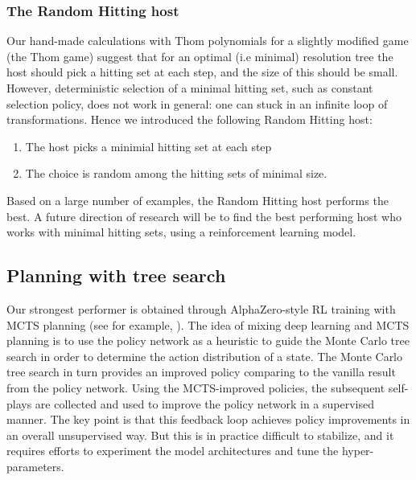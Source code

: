 \documentclass{article}
\theoremstyle{plain}
\theoremstyle{definition}
\theoremstyle{remark}
\begin{document}
\subsubsection{The Random Hitting host}\label{randomhittinghost}
Our hand-made calculations with Thom polynomials for a slightly modified game (the Thom game) suggest that for an optimal (i.e minimal) resolution tree the host should pick a hitting set at each step, and the size of this should be small. %
However, deterministic selection of a minimal hitting set, such as constant selection policy, does not work in general: one can stuck in an infinite loop of transformations. Hence we introduced the following Random Hitting host: 
\begin{enumerate}
    \item The host picks a minimial hitting set at each step 
    \item The choice is random among the hitting sets of minimal size. 
\end{enumerate}
Based on a large number of examples, the Random Hitting host performs the best. A future direction of research will be to find the best performing host who works with minimal hitting sets, using a reinforcement learning model. 


\subsection{Planning with tree search}\label{MCTS_planning}
Our strongest performer is obtained through AlphaZero-style RL training with MCTS planning (see for example, \cite{alphazero}). The idea of mixing deep learning and MCTS planning is to use the policy network as a heuristic to guide the Monte Carlo tree search in order to determine the action distribution of a state. The Monte Carlo tree search in turn provides an improved policy comparing to the vanilla result from the policy network. Using the MCTS-improved policies, the subsequent self-plays are collected and used to improve the policy network in a supervised manner. The key point is that this feedback loop achieves policy improvements in an overall unsupervised way. But this is in practice difficult to stabilize, and it requires efforts to experiment the model architectures and tune the hyper-parameters.
\end{document}
